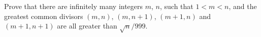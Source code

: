Prove that there are infinitely many integers $m$, $n$, such that $1 < m < n$, and the greatest common divisors $(m, n)$, $(m, n+1)$, $(m+1, n)$ and $(m+1, n+1)$ are all greater than $\sqrt{n}/999$.